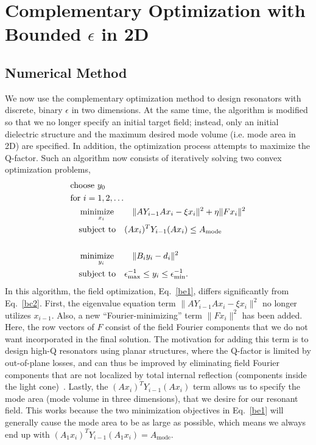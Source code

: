 \section{Complementary Optimization with Bounded $\epsilon$ in 2D}\label{sec:2Dbounded}
\subsection{Numerical Method}\label{sec:2Dnum}
We now use the complementary optimization method to design resonators with discrete, binary $\epsilon$ in two dimensions. At the same time, the algorithm is modified so that we no longer specify an initial target field; instead, only an initial dielectric structure and the maximum desired mode volume (i.e. mode area in 2D) are specified. In addition, the optimization process attempts to maximize the Q-factor. Such an algorithm now consists of iteratively solving two convex optimization problems,
\begin{align}
&\text{choose $y_0$} \nonumber \\
&\text{for } i = 1, 2, \ldots \nonumber \\
&\quad\operatorname*{\text{minimize}\quad}_{x_i}\quad \|A Y_{i-1} A x_i - \xi x_{i}\|^2 +   \eta \|F x_i\|^2\nonumber \\
&\quad\text{subject to}\quad (A x_i)^T Y_{i-1} (A x_i) \leq A_\text{mode} \label{be1} \\
\nonumber \\
&\quad\operatorname*{\text{minimize}\quad}_{y_i}\quad \|B_i y_i-d_i\|^2 \nonumber \\
&\quad\text{subject to}\quad \epsilon_\text{max}^{-1} \leq y_i \leq \epsilon_\text{min}^{-1}. \label{be2} 
\end{align}
In this algorithm, the field optimization, Eq.~\eqref{be1}, differs significantly from Eq.~\eqref{bc2}. First, the eigenvalue equation term $\|A Y_{i-1} A x_i - \xi x_{i}\|^2$ no longer utilizes $x_{i-1}$. Also, a new ``Fourier-minimizing'' term $\|F x_i\|^2$ has been added. Here, the row vectors of $F$ consist of the field Fourier components that we do not want incorporated in the final solution. The motivation for adding this term is to design high-Q resonators using planar structures, where the Q-factor is limited by out-of-plane losses, and can thus be improved by eliminating field Fourier components that are not localized by total internal reflection (components inside the light cone)~\cite{Vuc05}. Lastly, the $(A x_i)^T Y_{i-1} (A x_i)$ term allows us to specify the mode area (mode volume in three dimensions), that we desire for our resonant field. This works because the two minimization objectives in Eq.~\eqref{be1} will generally cause the mode area to be as large as possible, which means we always end up with $(A_1 x_i)^T Y_{i-1} (A_1 x_i) = A_\text{mode}$.

